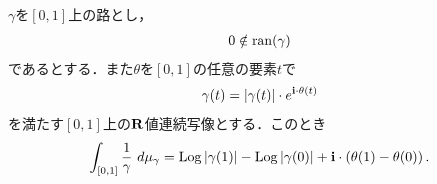 	\begin{screen}
		\begin{thm}[分数関数に対する微分積分学の基本定理]
		\label{thm:fundamental_theorem_of_calculus_for_fractional_function_complex_line_integral}
			$\gamma$を$[0,1]$上の路とし，
			\begin{align}
				0 \notin \operatorname*{ran} (\gamma)
			\end{align}
			であるとする．また$\theta$を$[0,1]$の任意の要素$t$で
			\begin{align}
				\gamma(t) = |\gamma(t)| \cdot e^{\mathbf{i} \cdot \theta(t)}
			\end{align}
			を満たす$[0,1]$上の$\mathbf{R}$値連続写像とする．このとき
			\begin{align}
				\int_{[0,1]} \frac{1}{\gamma}\ d\mu_{\gamma}
				= \operatorname{Log}{|\gamma(1)|} - \operatorname{Log}{|\gamma(0)|}
				+ \mathbf{i} \cdot \left(\theta(1) - \theta(0)\right).
			\end{align}
		\end{thm}
	\end{screen}
	
